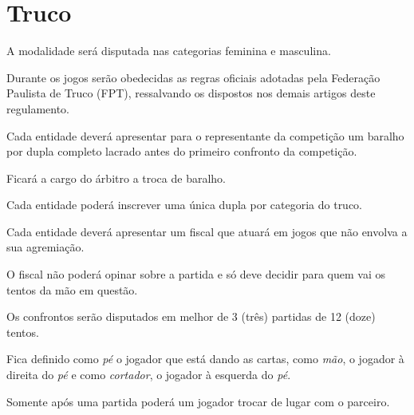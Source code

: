 {\let\clearpage\relax \chapter{Truco}}

\begin{article}
	A modalidade será disputada nas categorias feminina e masculina.
\end{article}

\begin{article}
	Durante os jogos serão obedecidas as regras oficiais adotadas pela Federação Paulista de Truco (FPT), ressalvando os dispostos nos demais artigos deste regulamento.
\end{article}

\begin{article}
	Cada entidade deverá apresentar para o representante da competição um baralho por dupla completo lacrado antes do primeiro confronto da competição.

	\begin{xparagraph}
		Ficará a cargo do árbitro a troca de baralho.
	\end{xparagraph}
\end{article}

\begin{article}
	Cada entidade poderá inscrever uma única dupla por categoria do truco.
\end{article}

\begin{article}
	Cada entidade deverá apresentar um fiscal que atuará em jogos que não envolva a sua agremiação.

	\begin{xparagraph}
		O fiscal não poderá opinar sobre a partida e só deve decidir para quem vai os tentos da mão em questão.
	\end{xparagraph}
\end{article}

\begin{article}
	Os confrontos serão disputados em melhor de 3 (três) partidas de 12 (doze) tentos.
\end{article}

\begin{article}
	Fica definido como \textit{pé} o jogador que está dando as cartas, como \textit{mão}, o jogador à direita do \textit{pé} e como \textit{cortador}, o jogador à esquerda do \textit{pé}.

	\begin{xparagraph}
		Somente após uma partida poderá um jogador trocar de lugar com o parceiro.
	\end{xparagraph}
\end{article}

